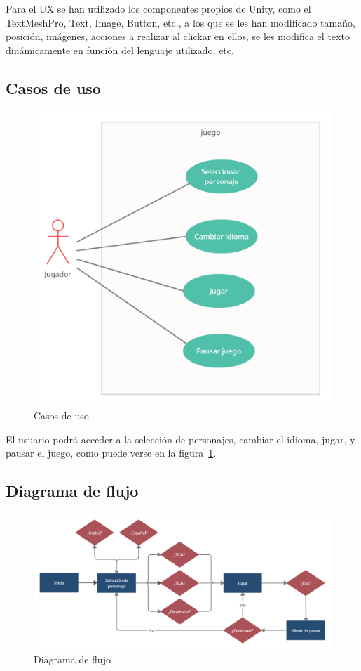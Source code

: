 \documentclass[12pt, a4paper,twoside,titlepage]{book}
\begin{document}
Para el UX se han utilizado los componentes propios de Unity, como el TextMeshPro, Text, Image, Button, etc., a los que se les han modificado tamaño, posición, imágenes, acciones a realizar al clickar en ellos, se les modifica el texto dinámicamente en función del lenguaje utilizado, etc. 





\subsection{Casos de uso}

\begin{figure}
	\centering
	\includegraphics[width=.5\linewidth]{TGF/Extra/Casos de uso.png}
	\caption{Casos de uso}
	\label{fig:casosuso}
\end{figure}

El usuario podrá acceder a la selección de personajes, cambiar el idioma, jugar, y pausar el juego, como puede verse en la figura~\ref{fig:casosuso}. 



\subsection{Diagrama de flujo}

\begin{figure}[tb]
	\hspace{-2em}
	\includegraphics[width=1.1\linewidth]{TGF/Extra/Flow.png}
	\caption{Diagrama de flujo}
	\label{fig:diagramaflujo}
\end{figure}
\end{document}
